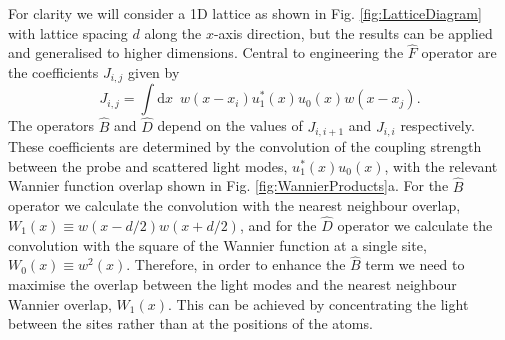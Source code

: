 
For clarity we will consider a 1D lattice as shown in
Fig. \ref{fig:LatticeDiagram} with lattice spacing $d$ along the
$x$-axis direction, but the results can be applied and generalised to
higher dimensions. Central to engineering the $\hat{F}$ operator are
the coefficients $J_{i,j}$ given by
\begin{equation}
  \label{eq:Jcoeff}
  J_{i,j} = \int \mathrm{d} x \,\,\, w(x - x_i) u_1^*(x) u_0(x) w(x - x_j).
\end{equation}
The operators $\hat{B}$ and $\hat{D}$ depend on the values of
$J_{i,i+1}$ and $J_{i,i}$ respectively. These coefficients are
determined by the convolution of the coupling strength between the
probe and scattered light modes, $u_1^*(x)u_0(x)$, with the relevant
Wannier function overlap shown in Fig. \ref{fig:WannierProducts}a. For
the $\hat{B}$ operator we calculate the convolution with the nearest
neighbour overlap, $W_1(x) \equiv w(x - d/2) w(x + d/2)$, and for the
$\hat{D}$ operator we calculate the convolution with the square of the
Wannier function at a single site, $W_0(x) \equiv w^2(x)$. Therefore,
in order to enhance the $\hat{B}$ term we need to maximise the overlap
between the light modes and the nearest neighbour Wannier overlap,
$W_1(x)$. This can be achieved by concentrating the light between the
sites rather than at the positions of the atoms. 


